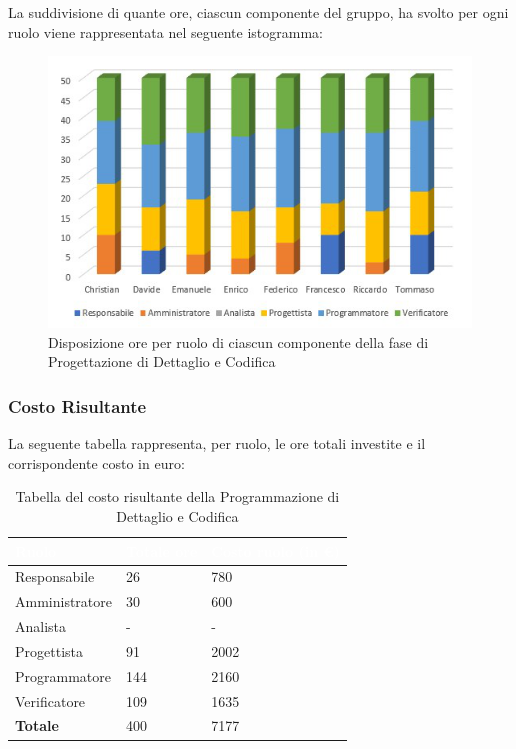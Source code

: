 La suddivisione di quante ore, ciascun componente del gruppo, ha svolto per ogni ruolo viene rappresentata nel seguente istogramma:
\begin{figure}[h!]
\centering
\includegraphics{Sezioni/Istogrammi/IstogrammaDiDettaglio.png}
\caption{Disposizione ore per ruolo di ciascun componente della fase di Progettazione di Dettaglio e Codifica}
\end{figure}

\clearpage

\subsubsection{Costo Risultante}
La seguente tabella rappresenta, per ruolo, le ore totali investite e il corrispondente costo in euro:
{
\renewcommand{\arraystretch}{2}
\begin{longtable}{ C{3cm} C{2cm} C{4cm}}
\caption{Tabella del costo risultante della Programmazione di Dettaglio e Codifica}\\

\textcolor{white}{\textbf{Ruolo}} & 
\textcolor{white}{\textbf{Totale ore}} & 
\textcolor{white}{\textbf{Costo ruolo (in \euro{})}}\\	
\endhead
        
Responsabile    &  26 &  780 \\
Amministratore  &  30 &  600 \\
Analista        &   - &    - \\
Progettista     &  91 & 2002 \\
Programmatore   & 144 & 2160 \\
Verificatore    & 109 & 1635 \\
\textbf{Totale} & 400 & 7177 \\
		
\end{longtable}
}

